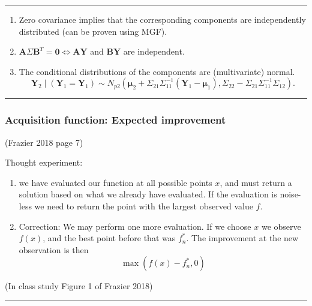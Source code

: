 \documentclass[
  letterpaper,
  DIV=11,
  numbers=noendperiod]{scrartcl}
\providecommand{\tightlist}{%
  \setlength{\itemsep}{0pt}\setlength{\parskip}{0pt}}\usepackage{longtable,booktabs,array}
\begin{document}
\begin{center}\rule{0.5\linewidth}{0.5pt}\end{center}

\begin{enumerate}
\def\labelenumi{\arabic{enumi}.}
\setcounter{enumi}{3}
\tightlist
\item
  Zero covariance implies that the corresponding components are
  independently distributed (can be proven using MGF).
\item
  \(\boldsymbol{A}\Sigma\boldsymbol{B}^T=\boldsymbol{0} \Leftrightarrow \boldsymbol{A}\boldsymbol{Y}\)
  and \(\boldsymbol{B}\boldsymbol{Y}\) are independent.
\item
  The conditional distributions of the components are (multivariate)
  normal.
  \[\boldsymbol{Y}_2 \mid (\boldsymbol{Y}_1=\boldsymbol{Y}_1) \sim N_{p2}(\boldsymbol{\mu}_2+\Sigma_{21}\Sigma_{11}^{-1} (\boldsymbol{Y}_1-\boldsymbol{\mu}_1),\Sigma_{22}-\Sigma_{21}\Sigma_{11}^{-1}\Sigma_{12}).\]
\end{enumerate}

\begin{center}\rule{0.5\linewidth}{0.5pt}\end{center}

\hypertarget{acquisition-function-expected-improvement}{%
\subsubsection{Acquisition function: Expected
improvement}\label{acquisition-function-expected-improvement}}

(Frazier 2018 page 7)

Thought experiment:

\begin{enumerate}
\def\labelenumi{\arabic{enumi})}
\item
  we have evaluated our function at all possible points \(x\), and must
  return a solution based on what we already have evaluated. If the
  evaluation is noise-less we need to return the point with the largest
  observed value \(f\).
\item
  Correction: We may perform one more evaluation. If we choose \(x\) we
  observe \(f(x)\), and the best point before that was \(f^{*}_n\). The
  improvement at the new observation is then \[ \max(f(x)-f^{*}_n,0)\]
\end{enumerate}

(In class study Figure 1 of Frazier 2018)

\begin{center}\rule{0.5\linewidth}{0.5pt}\end{center}
\end{document}
